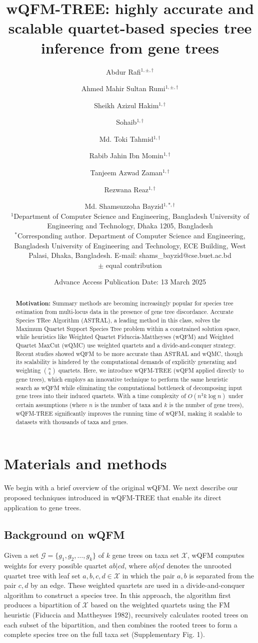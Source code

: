 \documentclass[11pt]{article}
\title{wQFM-TREE: highly accurate and scalable quartet-based species tree inference from gene trees}
\author{
  Abdur Rafi$^{1,\pm,\dagger}$ \and Ahmed Mahir Sultan Rumi$^{1,\pm,\dagger}$ \and Sheikh Azizul Hakim$^{1,\dagger}$ \and Sohaib$^{1,\dagger}$ \and Md. Toki Tahmid$^{1,\dagger}$ \and Rabib Jahin Ibn Momin$^{1,\dagger}$ \and Tanjeem Azwad Zaman$^{1,\dagger}$ \and Rezwana Reaz$^{1,\dagger}$ \and Md. Shamsuzzoha Bayzid$^{1,*,\dagger}$ \\
  \small{$^1$Department of Computer Science and Engineering, Bangladesh University of Engineering and Technology, Dhaka 1205, Bangladesh} \\
  \small{$^*$Corresponding author. Department of Computer Science and Engineering, Bangladesh University of Engineering and Technology, ECE Building, West Palasi, Dhaka, Bangladesh. E-mail: shams\_bayzid@cse.buet.ac.bd} \\
  \small{$\pm$ equal contribution}
}
\date{Advance Access Publication Date: 13 March 2025}
\begin{document}
\maketitle

\begin{abstract}
\textbf{Motivation:} Summary methods are becoming increasingly popular for species tree estimation from multi-locus data in the presence of gene tree discordance. Accurate Species TRee Algorithm (ASTRAL), a leading method in this class, solves the Maximum Quartet Support Species Tree problem within a constrained solution space, while heuristics like Weighted Quartet Fiduccia-Mattheyses (wQFM) and Weighted Quartet MaxCut (wQMC) use weighted quartets and a divide-and-conquer strategy. Recent studies showed wQFM to be more accurate than ASTRAL and wQMC, though its scalability is hindered by the computational demands of explicitly generating and weighting $\binom{n}{4}$ quartets. Here, we introduce wQFM-TREE (wQFM applied directly to gene trees), which employs an innovative technique to perform the same heuristic search as wQFM while eliminating the computational bottleneck of decomposing input gene trees into their induced quartets. With a time complexity of $O(n^3 k \log n)$ under certain assumptions (where $n$ is the number of taxa and $k$ is the number of gene trees), wQFM-TREE significantly improves the running time of wQFM, making it scalable to datasets with thousands of taxa and genes.
\end{abstract}

\section*{Materials and methods}

We begin with a brief overview of the original wQFM. We next describe our proposed techniques introduced in wQFM-TREE that enable its direct application to gene trees.

\subsection*{Background on wQFM}

Given a set $\mathcal{G}=\{g_1, g_2, \ldots, g_k\}$ of $k$ gene trees on taxa set $\mathcal{X}$, wQFM computes weights for every possible quartet $ab|cd$, where $ab|cd$ denotes the unrooted quartet tree with leaf set $a, b, c, d \in \mathcal{X}$ in which the pair $a, b$ is separated from the pair $c, d$ by an edge. These weighted quartets are used in a divide-and-conquer algorithm to construct a species tree. In this approach, the algorithm first produces a bipartition of $\mathcal{X}$ based on the weighted quartets using the FM heuristic (Fiduccia and Mattheyses 1982), recursively calculates rooted trees on each subset of the bipartition, and then combines the rooted trees to form a complete species tree on the full taxa set (Supplementary Fig. 1).
\end{document}
